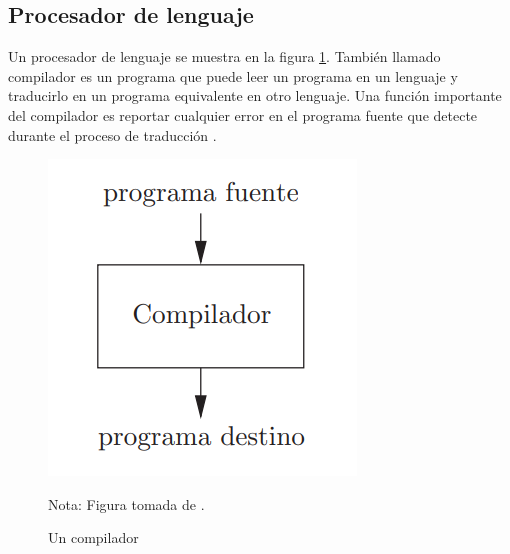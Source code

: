 \subsection{Procesador de lenguaje}
Un procesador de lenguaje se muestra en la figura \ref{compilador1}. También llamado compilador es un programa que puede leer un programa en un lenguaje y traducirlo en un programa equivalente en otro lenguaje. Una función importante del compilador es reportar cualquier error en el programa fuente que detecte durante el proceso de traducción \cite{aho2008compiladores}.
\begin{figure}[ht!]
\centering
\includegraphics[scale=0.6]{imagenes/compilador1}
\caption{Un compilador}
Nota: Figura tomada de \cite{aho2008compiladores}.
\label{compilador1}
\end{figure}

